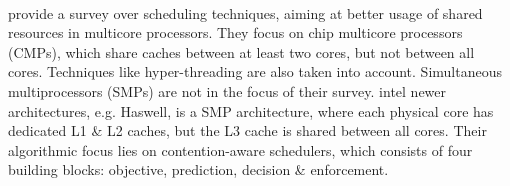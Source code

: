 \paragraph{ \cite{zhuravlev_survey_2012} } \citeauthor{zhuravlev_survey_2012}
provide a survey over scheduling techniques, aiming at better usage of shared
resources in multicore processors.
They focus on chip multicore processors (CMPs), which share caches between at
least two cores, but not between all cores.
Techniques like hyper-threading are also taken into account.
Simultaneous multiprocessors (SMPs) are not in the focus of their survey.
\gls{intel} newer architectures, e.g. Haswell, is a SMP architecture, where each
physical core has dedicated L1 \& L2 caches, but the L3 cache is shared between
all cores.
Their algorithmic focus lies on contention-aware schedulers, which consists of
four building blocks: objective, prediction, decision \& enforcement.



\paragraph{ \cite{knauerhase_using_2008} }
\paragraph{ \cite{yarom_recovering_2014} }
\paragraph{ \cite{bernstein_cache-timing_2005} }
\paragraph{ \cite{eyerman_probabilistic_2010} }
\paragraph{ \cite{fedorova_managing_2010} }
\paragraph{ \cite{zhuravlev_addressing_2010} }
\paragraph{ \cite{liu_last-level_2015} }
